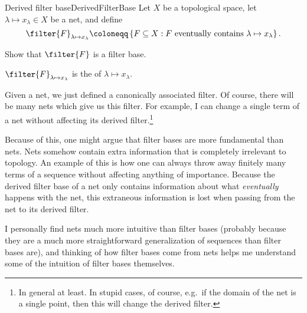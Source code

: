 \begin{dfn}{Derived filter base}{DerivedFilterBase}
Let $X$ be a topological space, let $\lambda \mapsto x_\lambda \in X$ be a net, and define
\begin{equation}
\filter{F}_{\lambda \mapsto x_\lambda}\coloneqq \left\{ F\subseteq X:F\text{ eventually contains }\lambda \mapsto x_\lambda \right\} .
\end{equation}
\begin{exr}[breakable=false]{}{}
Show that $\filter{F}$ is a filter base.
\end{exr}
$\filter{F}_{\lambda \mapsto x_\lambda}$ is the  of $\lambda \mapsto x_\lambda$.
\begin{rmk}
Given a net, we just defined a canonically associated filter.  Of course, there will be many nets which give us this filter.  For example, I can change a single term of a net without affecting its derived filter.\footnote{In general at least.  In stupid cases, of course, e.g.~if the domain of the net is a single point, then this will change the derived filter.}
\end{rmk}
\begin{rmk}
Because of this, one might argue that filter bases are more fundamental than nets.  Nets somehow contain extra information that is completely irrelevant to topology.  An example of this is how one can always throw away finitely many terms of a sequence without affecting anything of importance.  Because the derived filter base of a net only contains information about what \emph{eventually} happens with the net, this extraneous information is lost when passing from the net to its derived filter.
\end{rmk}
\begin{rmk}
I personally find nets much more intuitive than filter bases (probably because they are a much more straightforward generalization of sequences than filter bases are), and thinking of how filter bases come from nets helps me understand some of the intuition of filter bases themselves.
\end{rmk}
\end{dfn}

